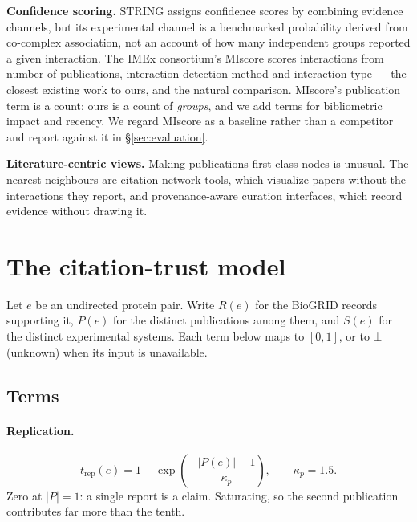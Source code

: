 \documentclass[conference]{IEEEtran}
\begin{document}
\textbf{Confidence scoring.} STRING \cite{string} assigns confidence scores by combining
evidence channels, but its experimental channel is a benchmarked probability derived
from co-complex association, not an account of how many independent groups reported a
given interaction. The IMEx consortium's MIscore \cite{miscore} scores interactions from
number of publications, interaction detection method and interaction type --- the
closest existing work to ours, and the natural comparison. MIscore's publication term is
a count; ours is a count of \emph{groups}, and we add terms for bibliometric impact and
recency. We regard MIscore as a baseline rather than a competitor and report against it
in \S\ref{sec:evaluation}.

\textbf{Literature-centric views.} Making publications first-class nodes is unusual.
The nearest neighbours are citation-network tools, which visualize papers without the
interactions they report, and provenance-aware curation interfaces, which record
evidence without drawing it.

\section{The citation-trust model}
\label{sec:trust}

Let $e$ be an undirected protein pair. Write $R(e)$ for the BioGRID records supporting
it, $P(e)$ for the distinct publications among them, and $S(e)$ for the distinct
experimental systems. Each term below maps to $[0,1]$, or to $\bot$ (unknown) when its
input is unavailable.

\subsection{Terms}

\paragraph{Replication.}
\begin{equation}
  t_{\mathrm{rep}}(e) = 1 - \exp\!\left(-\frac{|P(e)| - 1}{\kappa_p}\right),
  \qquad \kappa_p = 1.5 .
\end{equation}
Zero at $|P| = 1$: a single report is a claim. Saturating, so the second publication
contributes far more than the tenth.
\end{document}
